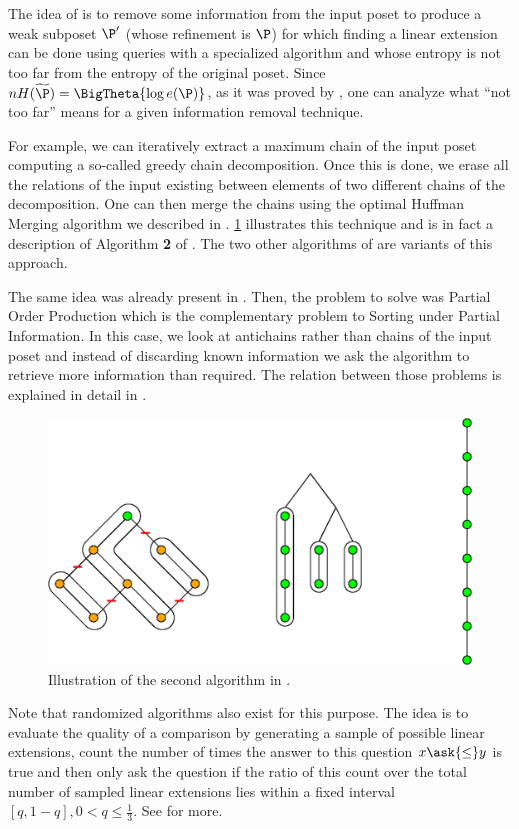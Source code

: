 The idea of \citet*{cardinal:2013} is to remove some information from the input
poset to produce a weak subposet \(\P'\) (whose refinement is \(\P\)) for which
finding a linear extension can be done using  queries with a
specialized algorithm and whose entropy is not too far from the entropy of the
original poset. Since \(n H(\widetilde{\P}) = \BigTheta{\log e(\P)}\), as it
was proved by \citet*{kahn:1995}, one can analyze what ``not too far'' means
for a given information removal technique.

For example, we can iteratively extract a maximum chain of the input poset
computing a so-called greedy chain decomposition. Once this is done, we
erase all the relations of the input existing between elements of two different
chains of the decomposition. One can then merge the chains using the optimal
Huffman Merging algorithm we described in .
\ref{fig:supi/alg2} illustrates this technique and is in fact a description of
Algorithm \textbf{2} of \citet{cardinal:2013}. The two other algorithms of
\citet*{cardinal:2013} are variants of this approach.

The same idea was already present in \citet*{cardinal:2010}. Then, the problem
to solve was Partial Order Production which is the complementary problem to
Sorting under Partial Information. In this case, we look at antichains rather
than chains of the input poset and instead of discarding known information we ask
the algorithm to retrieve more information than required. The relation between
those problems is explained in detail in \cite{DBLP:conf/birthday/CardinalF13}.

\begin{figure}
	\centering
	\includegraphics[height=0.2\textheight]{fig/supi/reduction:diag}
	\caption{\label{fig:supi/alg2} Illustration of the second algorithm in
\citet*{cardinal:2013}.}
\end{figure}


Note that randomized algorithms also exist for this purpose. The idea is to
evaluate the quality of a comparison by generating a sample of possible linear
extensions, count the number of times the answer to this question \(x
\ask{\le} y\) is true and then only ask the question if the ratio of
this count over the total number of sampled linear extensions lies within a
fixed interval $[q, 1-q], 0 < q \le \frac{1}{3}$. See \citet*{huber2006fast} for
more.

